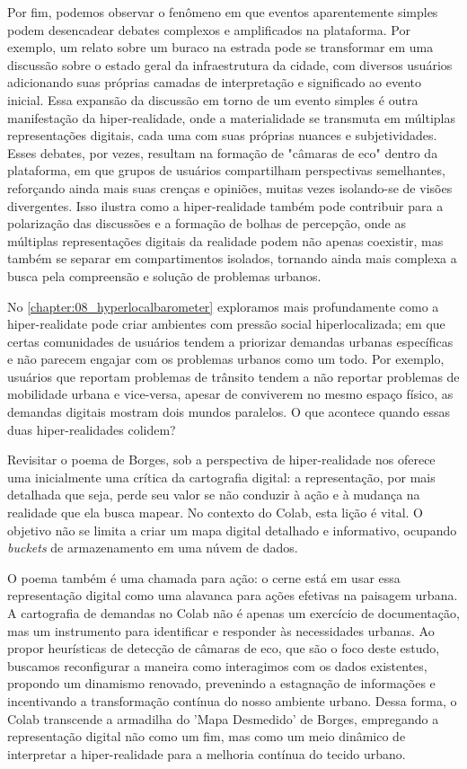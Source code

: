 Por fim, podemos observar o fenômeno em que eventos aparentemente simples podem desencadear debates complexos e amplificados na plataforma. Por exemplo, um relato sobre um buraco na estrada pode se transformar em uma discussão sobre o estado geral da infraestrutura da cidade, com diversos usuários adicionando suas próprias camadas de interpretação e significado ao evento inicial. Essa expansão da discussão em torno de um evento simples é outra manifestação da hiper-realidade, onde a materialidade se transmuta em múltiplas representações digitais, cada uma com suas próprias nuances e subjetividades. Esses debates, por vezes, resultam na formação de "câmaras de eco" dentro da plataforma, em que grupos de usuários compartilham perspectivas semelhantes, reforçando ainda mais suas crenças e opiniões, muitas vezes isolando-se de visões divergentes. Isso ilustra como a hiper-realidade também pode contribuir para a polarização das discussões e a formação de bolhas de percepção, onde as múltiplas representações digitais da realidade podem não apenas coexistir, mas também se separar em compartimentos isolados, tornando ainda mais complexa a busca pela compreensão e solução de problemas urbanos.

No \autoref{chapter:08_hyperlocalbarometer} exploramos mais profundamente como a hiper-realidate pode criar ambientes com pressão social hiperlocalizada; em que certas comunidades de usuários tendem a priorizar demandas urbanas específicas e não parecem engajar com os problemas urbanos como um todo. Por exemplo, usuários que reportam problemas de trânsito tendem a não reportar problemas de mobilidade urbana e vice-versa, apesar de conviverem no mesmo espaço físico, as demandas digitais mostram dois mundos paralelos. O que acontece quando essas duas hiper-realidades colidem?

Revisitar o poema de Borges, sob a perspectiva de hiper-realidade nos oferece uma inicialmente uma crítica da cartografia digital: a representação, por mais detalhada que seja, perde seu valor se não conduzir à ação e à mudança na realidade que ela busca mapear. No contexto do Colab, esta lição é vital. O objetivo não se limita a criar um mapa digital detalhado e informativo, ocupando \textit{buckets} de armazenamento em uma núvem de dados. 

O poema também é uma chamada para ação: o cerne está em usar essa representação digital como uma alavanca para ações efetivas na paisagem urbana. A cartografia de demandas no Colab não é apenas um exercício de documentação, mas um instrumento para identificar e responder às necessidades urbanas. Ao propor heurísticas de detecção de câmaras de eco, que são o foco deste estudo, buscamos reconfigurar a maneira como interagimos com os dados existentes, propondo um dinamismo renovado, prevenindo a estagnação de informações e incentivando a transformação contínua do nosso ambiente urbano. Dessa forma, o Colab transcende a armadilha do 'Mapa Desmedido' de Borges, empregando a representação digital não como um fim, mas como um meio dinâmico de interpretar a hiper-realidade para a melhoria contínua do tecido urbano.

